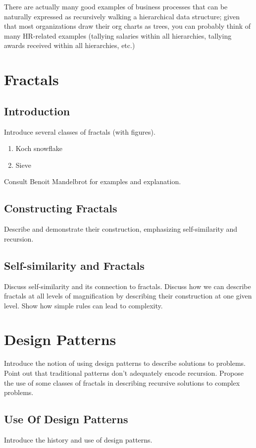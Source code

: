 \documentclass[jou,apacite]{apa6}
\begin{document}
There are actually many good examples of business processes that can be naturally expressed as recursively walking a hierarchical data structure; given that most organizations draw their org charts as trees, you can probably think of many HR-related examples (tallying salaries within all hierarchies, tallying awards received within all hierarchies, etc.)

\section{Fractals}  %
\subsection{Introduction}
Introduce several classes of fractals (with figures).
\begin{enumerate}
  \item Koch snowflake
  \item Sieve 
\end{enumerate}
Consult Benoit Mandelbrot for examples and explanation.

\subsection{Constructing Fractals}
Describe and demonstrate their construction, emphasizing self-similarity and recursion.

\subsection{Self-similarity and Fractals}
Discuss self-similarity and its connection to fractals.  Discuss how we can describe fractals at all levels of magnification by describing their construction at one given level.  Show how simple rules can lead to complexity.

\section{Design Patterns}  %
Introduce the notion of using design patterns to describe solutions to problems.  Point out that traditional patterns don't adequately encode recursion.  Propose the use of some classes of fractals in describing recursive solutions to complex problems.
\subsection{Use Of Design Patterns}
Introduce the history and use of design patterns.~\cite{Gamma}
\end{document}
